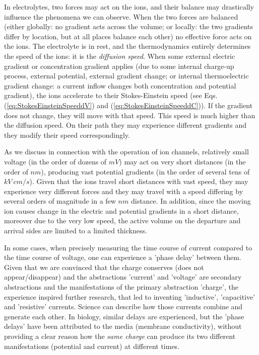 In electrolytes, two forces may act on the ions,
and their balance may drastically influence the phenomena we can observe.
When the two forces are balanced (either globally: no gradient acts
across the volume; or locally: the two gradients differ by location,
but at all places balance each other) no effective force acts on the ions.
The electrolyte is in rest, and the thermodynamics entirely determines 
the speed of the ions: it is the \textit{diffusion speed}.
When some external electric gradient or concentration gradient applies
(due to some internal charge-up process, external potential,
external gradient change; or internal thermoelectric gradient change:
a current inflow changes both concentration and potential gradient),
the ions accelerate to their Stokes-Einstein speed 
(see Eqs. (\ref{eq:StokesEinsteinSpeeddV}) and (\ref{eq:StokesEinsteinSpeeddC})).
If the gradient does not change, they will move with that speed.
This speed is much higher than the diffusion speed.
On their path they may experience different gradients and they
modify their speed correspondingly.

As we discuss in connection with the operation of ion channels,
relatively small voltage (in the order of dozens of $mV$) may act on
very short distances (in the order of $nm$), producing vast potential
gradients (in the order of several tens of $kV\ cm/s$).
Given that the ions travel short distances with vast speed,
they may experience very different forces and they may travel with a
speed differing by several orders of magnitude in a few $nm$ distance.
In addition, since the moving ion causes change in the electric and potential
gradients in a short distance, moreover due to the very low speed,
the active volume on the departure and arrival sides are limited
to a limited thickness. 


In some cases, when precisely measuring the time course of current
compared to the time course of voltage, one can experience a 'phase delay'
between them.  Given that we are convinced that
the charge conserves (does not appear/disappear) and
the abstractions 'current' and 'voltage'
are secondary abstractions and the manifestations of the primary abstraction 'charge',
the experience inspired further research, that led to inventing
'inductive', 'capacitive' and 'resistive' currents. Science can describe
how those currents combine and generate each other. In biology, similar delays are experienced, but the 'phase delays'
have been attributed to the media (membrane conductivity),
without providing a clear reason how the \textit{same charge}
can produce its two different manifestations (potential and current) at different times.

